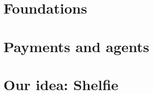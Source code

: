 \documentclass[11pt,a4paper,oneside]{report}
\begin{document}
\tableofcontents

\part{Foundations}



\part{Payments and agents}




\part{Our idea: Shelfie}





\appendix

\end{document}
